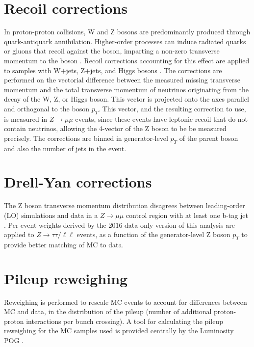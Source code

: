 \section{Recoil corrections}
\label{sec:ch-8-recoil-corrections}
In proton-proton collisions, W and Z bosons are predominantly produced through quark-antiquark annihilation. Higher-order processes can induce radiated quarks or gluons that recoil against the boson, imparting a non-zero transverse momentum to the boson \cite{2009-Tevatron-recoil-correction}. Recoil corrections accounting for this effect are applied to samples with W+jets, Z+jets, and Higgs bosons \cite{twiki_HiggsToTauTauWorkingLegacyRun2}. The corrections are performed on the vectorial difference between the measured missing transverse momentum and the total transverse momentum of neutrinos originating from the decay of the W, Z, or Higgs boson. This vector is projected onto the axes parallel and orthogonal to the boson $p_{T}$. This vector, and the resulting correction to use, is measured in $Z \rightarrow \mu\mu$ events, since these events have leptonic recoil that do not contain neutrinos, allowing the 4-vector of the Z boson to be be measured precisely. The corrections are binned in generator-level $p_{T}$ of the parent boson and also the number of jets in the event.

\section{Drell-Yan corrections}
The Z boson transverse momentum distribution disagrees between leading-order (LO) simulations and data in a $Z \rightarrow \mu\mu$ control region with at least one b-tag jet \cite{CMS-HIG-17-024}. Per-event weights derived by the 2016 data-only version of this analysis \cite{CMS-HIG-17-024} are applied to $Z \rightarrow \tau\tau / \ell \ell$ events, as a function of the generator-level Z boson $p_{T}$ to provide better matching of MC to data.

\section{Pileup reweighing}
Reweighing is performed to rescale MC events to account for differences between MC and data, in the distribution of the pileup (number of additional proton-proton interactions per bunch crossing). A tool for calculating the pileup reweighing for the MC samples used is provided centrally by the Luminosity POG \cite{twiki_LUMI_POG_recommendation}.


